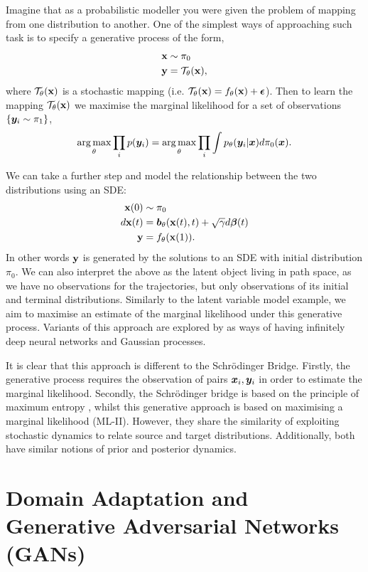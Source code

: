\documentclass[a4paper,12pt,twoside,openright]{report}
\theoremstyle{definition}
\begin{document}
Imagine that as a probabilistic modeller you were given the problem of mapping from one distribution to another. One of the simplest ways of approaching such task is to specify a generative process of the form,
\begin{align*}
    {\mathbf{x}} &\sim \pi_0 \\
    {\mathbf{y}} &= {\mathcal{T}}_{\theta}({\mathbf{x}}),
\end{align*}
where ${\mathcal{T}}_{\theta}({\mathbf{x}})$  is a stochastic mapping (i.e. ${\mathcal{T}}_{\theta}({\mathbf{x}}) = f_{\theta}({\mathbf{x}}) + {\bm{\epsilon}}$). Then to learn the mapping ${\mathcal{T}}_{\theta}({\mathbf{x}})$  we maximise the marginal likelihood for a set of observations $\{{\bm{y}}_i \sim \pi_1 \}$,
\begin{align*}
   \operatorname*{arg\,max}_{\theta} \prod_i p({\bm{y}}_i) = \operatorname*{arg\,max}_{\theta} \prod_i \int p_{\theta}({\bm{y}}_i | {\bm{x}}) d\pi_0({\bm{x}}).
\end{align*}

We can take a further step and model the relationship between the two distributions using an SDE:
\begin{align*}
    {\mathbf{x}}(0) &\sim \pi_0 \\
    d{\mathbf{x}}(t) &= {\bm{b}}_{\theta}({\mathbf{x}}(t), t) + \sqrt{\gamma} d{\bm{\beta}}(t) \\
    {\mathbf{y}} &= f_{\theta}({\mathbf{x}}(1)).
\end{align*}
In other words ${\mathbf{y}}$ is generated by the solutions to an SDE with initial distribution $\pi_0$. We can also interpret the above as the latent object living in path space, as we have no observations for the trajectories, but only observations of its initial and terminal distributions. Similarly to the latent variable model example, we aim to maximise an estimate of the marginal likelihood under this generative process. Variants of this approach are explored by \citep{lahdesmakideep, tzen2019neural} as ways of having infinitely deep neural networks and Gaussian processes.

It is clear that this approach is different to the Schrödinger Bridge. Firstly, the generative process requires the observation of pairs ${\bm{x}}_i, {\bm{y}}_i$ in order to estimate the marginal likelihood. Secondly, the Schrödinger bridge is based on the principle of maximum entropy \citep{jaynes1957information}, whilst this generative approach is based on maximising a marginal likelihood (ML-II). However, they share the similarity of exploiting stochastic dynamics to relate source and target distributions. Additionally, both have similar notions of prior and posterior dynamics.

\section{Domain Adaptation and Generative Adversarial Networks (GANs)}
\end{document}
